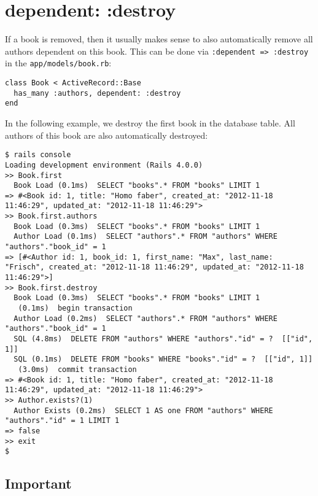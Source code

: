 \documentclass[a4paper]{book}
\newcounter{tab}[chapter]
\begin{document}
\section{dependent: :destroy}\label{dependent-destroy}

If a book is removed, then it usually makes sense to also automatically remove all authors dependent on this book. This can be done via \texttt{:dependent =\textgreater{} :destroy} in the \texttt{app/models/book.rb}:

\begin{shaded}\begin{verbatim}
class Book < ActiveRecord::Base
  has_many :authors, dependent: :destroy
end
\end{verbatim}\end{shaded}

In the following example, we destroy the first book in the database table. All authors of this book are also automatically destroyed:

\begin{shaded}\begin{verbatim}
$ rails console
Loading development environment (Rails 4.0.0)
>> Book.first
  Book Load (0.1ms)  SELECT "books".* FROM "books" LIMIT 1
=> #<Book id: 1, title: "Homo faber", created_at: "2012-11-18 11:46:29", updated_at: "2012-11-18 11:46:29">
>> Book.first.authors
  Book Load (0.3ms)  SELECT "books".* FROM "books" LIMIT 1
  Author Load (0.1ms)  SELECT "authors".* FROM "authors" WHERE "authors"."book_id" = 1
=> [#<Author id: 1, book_id: 1, first_name: "Max", last_name: "Frisch", created_at: "2012-11-18 11:46:29", updated_at: "2012-11-18 11:46:29">]
>> Book.first.destroy
  Book Load (0.3ms)  SELECT "books".* FROM "books" LIMIT 1
   (0.1ms)  begin transaction
  Author Load (0.2ms)  SELECT "authors".* FROM "authors" WHERE "authors"."book_id" = 1
  SQL (4.8ms)  DELETE FROM "authors" WHERE "authors"."id" = ?  [["id", 1]]
  SQL (0.1ms)  DELETE FROM "books" WHERE "books"."id" = ?  [["id", 1]]
   (3.0ms)  commit transaction
=> #<Book id: 1, title: "Homo faber", created_at: "2012-11-18 11:46:29", updated_at: "2012-11-18 11:46:29">
>> Author.exists?(1)
  Author Exists (0.2ms)  SELECT 1 AS one FROM "authors" WHERE "authors"."id" = 1 LIMIT 1
=> false
>> exit
$
\end{verbatim}\end{shaded}

\subsection{Important}\label{important-8}
\end{document}
